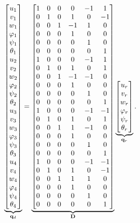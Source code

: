 {\small
\renewcommand\arraystretch{1.08}
\begin{equation}\label{rbe2-example-full-transformation}
\underbrace{\begin{bmatrix}
 u_1\\v_1\\w_1\\\varphi_1\\\psi_1\\\theta_1\\
 u_2\\v_2\\w_2\\\varphi_2\\\psi_2\\\theta_2\\
 u_3\\v_3\\w_3\\\varphi_3\\\psi_3\\\theta_3\\
 u_4\\v_4\\w_4\\\varphi_4\\\psi_4\\\theta_4
\end{bmatrix}}_{\mathbf{q}_d}
=
\underbrace{\begin{bmatrix}
1&0&0& 0&-1& 1\\
0&1&0& 1& 0&-1\\
0&0&1&-1& 1& 0\\
0&0&0& 1& 0& 0\\
0&0&0& 0& 1& 0\\
0&0&0& 0& 0& 1\\
1&0&0& 0&-1& 1\\
0&1&0& 1& 0& 1\\
0&0&1&-1&-1& 0\\
0&0&0& 1& 0& 0\\
0&0&0& 0& 1& 0\\
0&0&0& 0& 0& 1\\
1&0&0& 0&-1&-1\\
0&1&0& 1& 0& 1\\
0&0&1& 1&-1& 0\\
0&0&0& 1& 0& 0\\
0&0&0& 0& 1& 0\\
0&0&0& 0& 0& 1\\
1&0&0& 0&-1&-1\\
0&1&0& 1& 0&-1\\
0&0&1& 1& 1& 0\\
0&0&0& 1& 0& 0\\
0&0&0& 0& 1& 0\\
0&0&0& 0& 0& 1
\end{bmatrix}}_{\mathbf{D}}
\underbrace{\begin{bmatrix}
 u_r\\v_r\\w_r\\\varphi_r\\\psi_r\\\theta_r
\end{bmatrix}}_{\mathbf{q}_r}.
\end{equation}
\renewcommand\arraystretch{1}
}

